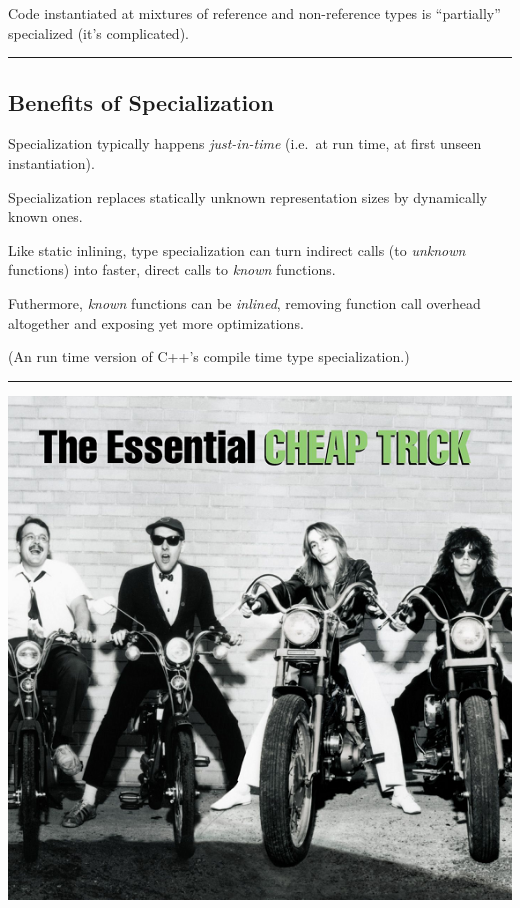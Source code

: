 Code instantiated at mixtures of reference and non-reference types is
``partially'' specialized (it's complicated).

\begin{center}\rule{0.5\linewidth}{\linethickness}\end{center}

\subsection{Benefits of
Specialization}\label{benefits-of-specialization}

Specialization typically happens \emph{just-in-time} (i.e.~at run time,
at first unseen instantiation).

Specialization replaces statically unknown representation sizes by
dynamically known ones.

Like static inlining, type specialization can turn indirect calls (to
\emph{unknown} functions) into faster, direct calls to \emph{known}
functions.

Futhermore, \emph{known} functions can be \emph{inlined}, removing
function call overhead altogether and exposing yet more optimizations.

(An run time version of C++'s compile time type specialization.)

\begin{center}\rule{0.5\linewidth}{\linethickness}\end{center}

\includegraphics{./images/CheapTrick.png}

